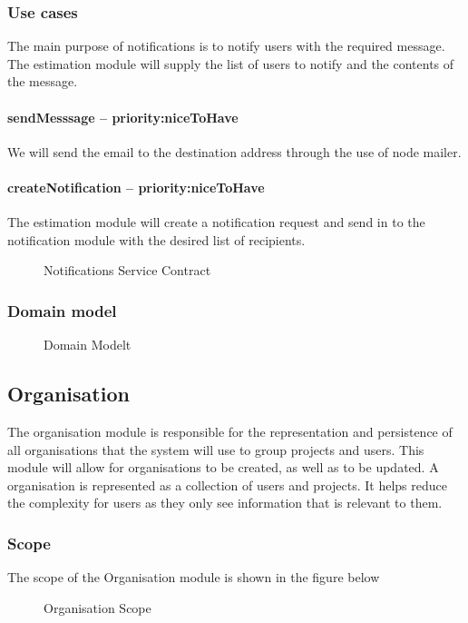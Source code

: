 \subsubsection{Use cases}
The main purpose of notifications is to notify users with the required message. The estimation module will supply the list of users to notify and the contents of the message.
\paragraph{sendMesssage -- priority:niceToHave}
We will send the email to the destination address through the use of node mailer. 
\paragraph{createNotification -- priority:niceToHave}
The estimation module will create a notification request and send in to the notification module with the desired list of recipients.
	\begin{figure}[H]
	    	\centering
	    	\caption{Notifications Service Contract}
	    	\label{fig:Notification_Service Contract}
   	\end{figure}
\subsubsection{Domain model}
	\begin{figure}[H]
	    	\centering
	    	\caption{Domain Modelt}
	    	\label{fig:Domain Model}
   	\end{figure}


\subsection{Organisation}
The organisation module is responsible for the representation and persistence of all organisations that the system will use to group projects and users. This module will allow for organisations to be created, as well as to be updated. A organisation is represented as a collection of users and projects. It helps reduce the complexity for users as they only see information that is relevant to them.

\subsubsection{Scope}
The scope of the Organisation module is shown in the figure below
	\begin{figure}[H]
	    	\centering
	    	\caption{Organisation Scope}
	    	\label{fig:Organisation_Scope}
   	\end{figure}
